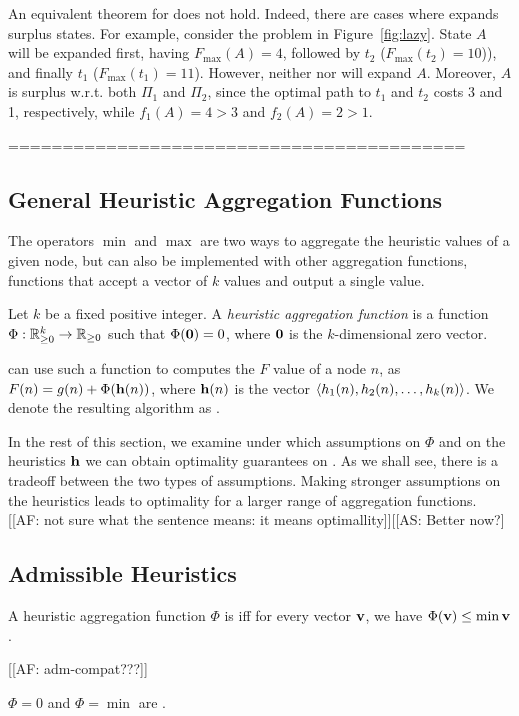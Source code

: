 An equivalent theorem for \kastarmax does not hold.
Indeed, there are cases where \kastarmax expands surplus states.
For example, consider the \kgs problem in Figure~\ref{fig:lazy}.
State $A$ will be expanded first, having $F_{\max}(A) = 4$, followed by $t_2$ ($F_{\max}(t_2) = 10$)), and finally $t_1$ ($F_{\max}(t_1) = 11$).
However, neither  nor  will expand $A$.
Moreover, $A$ is surplus w.r.t. both $\Pi_1$ and $\Pi_2$, since the optimal path to $t_1$ and $t_2$ costs 3 and 1, respectively, while $f_1(A) = 4 > 3$ and $f_2(A) = 2 > 1$.



==========================================






\subsection{General Heuristic Aggregation Functions}
The operators $\min$ and $\max$ are two ways to aggregate the heuristic values of a given node, but \kastar can also be implemented with other aggregation functions, functions that accept a vector of $k$ values and output a single value.
\begin{definition}
  Let $k$ be a fixed positive integer.
  A \emph{heuristic aggregation function} is a function $\Phi: \mathbb{R}_{\geq 0}^k \rightarrow \mathbb{R}_{\geq 0}$ such that $\Phi(\mathbf{0}) = 0$, where $\mathbf{0}$ is the $k$-dimensional zero vector.
\end{definition}
\kastar can use such a function to computes the $F$ value of a node $n$, as $F(n) = g(n) + \Phi(\mathbf{h}(n))$, where $\mathbf{h}(n)$ is the vector $\left \langle h_1(n), h_2(n), \dots, h_k(n) \right \rangle $.
We denote the resulting algorithm as \kastarphi.

In the rest of this section, we examine under which assumptions on $\Phi$ and on the heuristics $\mathbf{h}$ we can obtain optimality guarantees on \kastarphi.
As we shall see, there is a tradeoff between the two types of assumptions.
Making stronger assumptions on the heuristics leads to optimality for a larger range of aggregation functions. [[AF: not sure what the sentence means: it means optimallity]][[AS: Better now?]



\subsection{Admissible Heuristics}
\begin{definition}
  A heuristic aggregation function $\Phi$ is \emph{\axiomadm} iff for every vector $\mathbf{v}$, we have $\Phi(\mathbf{v}) \leq \min \mathbf{v}$.
\end{definition}
[[AF: adm-compat???]]
\begin{observation}
  $\Phi = 0$ and $\Phi=\min$ are \axiomadm.
\end{observation}

